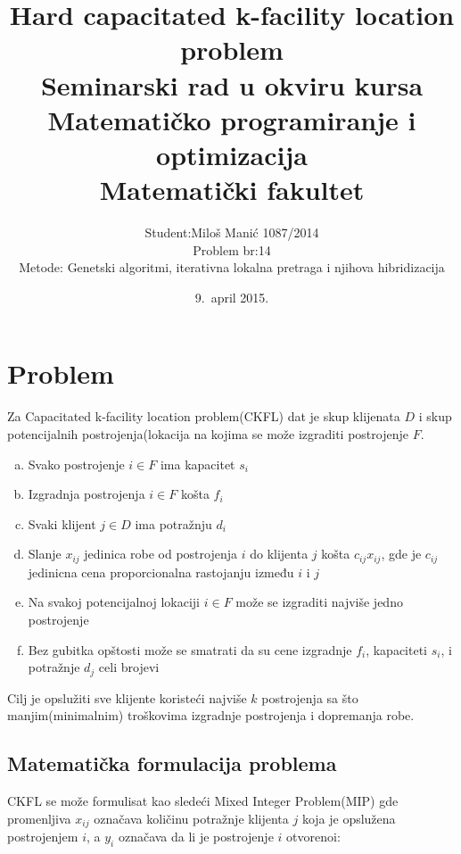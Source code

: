 \documentclass[a4paper]{article}
\begin{document}
\title{Hard capacitated k-facility location problem \\ \small{Seminarski rad u okviru kursa\\
Matematičko programiranje i optimizacija\\ Matematički fakultet}}

\author{
Student:Miloš Manić 1087/2014\\
Problem br:14\\
Metode: Genetski algoritmi, iterativna lokalna pretraga i njihova hibridizacija}
\date{9.~april 2015.}
\maketitle

\abstract{


}


\tableofcontents

\newpage

\section{Problem}


Za Capacitated k-facility location problem(CKFL) dat je skup klijenata $D$ i skup potencijalnih postrojenja(lokacija na kojima se može izgraditi postrojenje $F$\cite{original}.
\begin{enumerate}[a)]
\item Svako postrojenje $i \in F$ ima kapacitet $s_i$
\item Izgradnja postrojenja $i \in F$ košta $f_i$
\item Svaki klijent $j \in D$ ima potražnju $d_i$
\item Slanje $x_{ij}$ jedinica robe od postrojenja $i$ do klijenta $j$ košta $c_{ij}x_{ij}$, gde je $c_{ij}$ jedinicna cena proporcionalna rastojanju između $i$ i $j$
\item Na svakoj potencijalnoj lokaciji $i \in F$ može se izgraditi najviše jedno postrojenje
\item Bez gubitka opštosti može se smatrati da su cene izgradnje $f_i$, kapaciteti $s_i$, i potražnje $d_j$ celi brojevi

\end{enumerate}
Cilj je opslužiti sve klijente koristeći najviše $k$ postrojenja sa što manjim(minimalnim) troškovima izgradnje postrojenja i dopremanja robe.

\subsection{Matematička formulacija problema}
CKFL se može formulisat kao sledeći Mixed Integer Problem(MIP) gde promenljiva $x_{ij}$ označava količinu potražnje klijenta $j$ koja je opslužena postrojenjem $i$, a $y_i$ označava da li je postrojenje $i$ otvorenoi\cite{original}:
\end{document}
